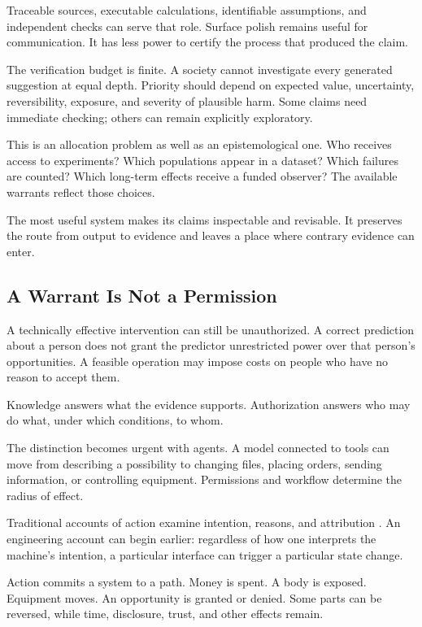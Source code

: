 \documentclass[11pt,openany]{book}
\begin{document}
Traceable sources, executable calculations, identifiable assumptions, and independent checks can serve that role. Surface polish remains useful for communication. It has less power to certify the process that produced the claim.

The verification budget is finite. A society cannot investigate every generated suggestion at equal depth. Priority should depend on expected value, uncertainty, reversibility, exposure, and severity of plausible harm. Some claims need immediate checking; others can remain explicitly exploratory.

This is an allocation problem as well as an epistemological one. Who receives access to experiments? Which populations appear in a dataset? Which failures are counted? Which long-term effects receive a funded observer? The available warrants reflect those choices.

The most useful system makes its claims inspectable and revisable. It preserves the route from output to evidence and leaves a place where contrary evidence can enter.

\subsection{A Warrant Is Not a Permission}

A technically effective intervention can still be unauthorized. A correct prediction about a person does not grant the predictor unrestricted power over that person's opportunities. A feasible operation may impose costs on people who have no reason to accept them.

Knowledge answers what the evidence supports. Authorization answers who may do what, under which conditions, to whom.

The distinction becomes urgent with agents. A model connected to tools can move from describing a possibility to changing files, placing orders, sending information, or controlling equipment. Permissions and workflow determine the radius of effect.

Traditional accounts of action examine intention, reasons, and attribution \cite{anscombe1957intention,davidson1963actions}. An engineering account can begin earlier: regardless of how one interprets the machine's intention, a particular interface can trigger a particular state change.

Action commits a system to a path. Money is spent. A body is exposed. Equipment moves. An opportunity is granted or denied. Some parts can be reversed, while time, disclosure, trust, and other effects remain.
\end{document}
